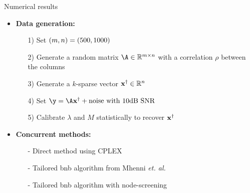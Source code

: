 \documentclass[final]{beamer}
\newlength{\sepwid}
\newlength{\onecolwid}
\newcommand{\emphone}[1]{{\color{norange}#1}}
\begin{document}
\begin{frame}[t]
\begin{columns}[t]
\begin{column}{\sepwid}\end{column}

\begin{column}{\onecolwid}
    \begin{block}{Numerical results}
        \begin{itemize}
            \item \hspace{0.1in} \textbf{Data generation:}
            \begin{itemize}
                \justifying
                \normalsize \item[1)] \hspace{0.1in} Set $(m,n)=(500,1000)$
                \item[2)] \hspace{0.1in} Generate a random matrix $\dic \in \kR^{\ddim\times\pdim}$ with a correlation $\rho$ between the columns
                \item[3)] \hspace{0.1in} Generate a $k$-sparse vector $\pv^{\dagger} \in \kR^{\pdim}$
                \item[4)] \hspace{0.1in} \normalsize Set $\obs = \dic\pv^{\dagger} + \text{noise with 10dB SNR}$
                \item[5)] \hspace{0.1in} \normalsize Calibrate $\lambda$ and $M$ statistically to recover $\mathbf{x}^{\dagger}$
            \end{itemize}
        \end{itemize}
        \begin{itemize}
            \item \hspace{0.1in} \textbf{Concurrent methods:}
            \begin{itemize}
                \normalsize \item[-] \hspace{0.1in} \normalsize Direct method using CPLEX
                \item[-] \hspace{0.1in} \normalsize Tailored \gls{bnb} algorithm from Mhenni \textit{et. al.} 
                \item[-] \hspace{0.1in} \normalsize Tailored \gls{bnb} algorithm with \emphone{node-screening}
            \end{itemize}
        \end{itemize}

\end{block}
\end{column}
\end{columns}
\end{frame}
\end{document}
